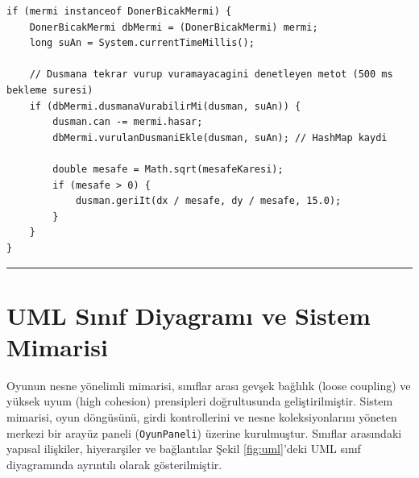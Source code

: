 \documentclass[12pt]{article}
\begin{document}
\begin{lstlisting}[caption={Döner Bıçak Hasar Zaman Damgası Takibi}, label={list:hashmapcooldown}]
if (mermi instanceof DonerBicakMermi) {
    DonerBicakMermi dbMermi = (DonerBicakMermi) mermi;
    long suAn = System.currentTimeMillis();
    
    // Dusmana tekrar vurup vuramayacagini denetleyen metot (500 ms bekleme suresi)
    if (dbMermi.dusmanaVurabilirMi(dusman, suAn)) {
        dusman.can -= mermi.hasar;
        dbMermi.vurulanDusmaniEkle(dusman, suAn); // HashMap kaydi
        
        double mesafe = Math.sqrt(mesafeKaresi);
        if (mesafe > 0) {
            dusman.geriIt(dx / mesafe, dy / mesafe, 15.0);
        }
    }
}
\end{lstlisting}

\bigskip
\hrule
\bigskip

\section{UML Sınıf Diyagramı ve Sistem Mimarisi}
Oyunun nesne yönelimli mimarisi, sınıflar arası gevşek bağlılık (loose coupling) ve yüksek uyum (high cohesion) prensipleri doğrultusunda geliştirilmiştir. Sistem mimarisi, oyun döngüsünü, girdi kontrollerini ve nesne koleksiyonlarını yöneten merkezi bir arayüz paneli (\texttt{OyunPaneli}) üzerine kurulmuştur. Sınıflar arasındaki yapısal ilişkiler, hiyerarşiler ve bağlantılar Şekil \ref{fig:uml}'deki UML sınıf diyagramında ayrıntılı olarak gösterilmiştir.
\end{document}
